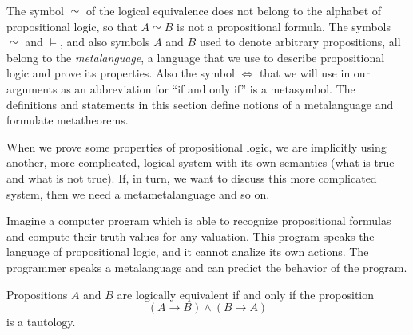 \begin{page}

\begin{rem}
The symbol $\simeq$ of the logical equivalence does not belong to the alphabet of propositional logic, so that $A \simeq B$ is not a propositional formula.
The symbols $\simeq$ and $\vDash$, and also symbols $A$ and $B$ used to denote arbitrary propositions,
all belong to the \emph{metalanguage}, a language that we use to describe propositional logic and prove its properties.
Also the symbol $\Leftrightarrow$ that we will use in our arguments as an abbreviation for ``if and only if'' is a metasymbol.
The definitions and statements in this section define notions of a metalanguage and formulate metatheorems.

When we prove some properties of propositional logic,
we are implicitly using another, more complicated, logical system with its own semantics (what is true and what is not true).
If, in turn, we want to discuss this more complicated system, then we need a metametalanguage and so on.

Imagine a computer program which is able to recognize propositional formulas and compute their truth values for any valuation.
This program speaks the language of propositional logic, and it cannot analize its own actions.
The programmer speaks a metalanguage and can predict the behavior of the program.
\end{rem}

\end{page}

\begin{page}

\begin{thm}
Propositions $A$ and $B$ are logically equivalent if and only if the proposition
\[
(A \to B) \wedge (B \to A)
\]
is a tautology.
\end{thm}

\end{page}

